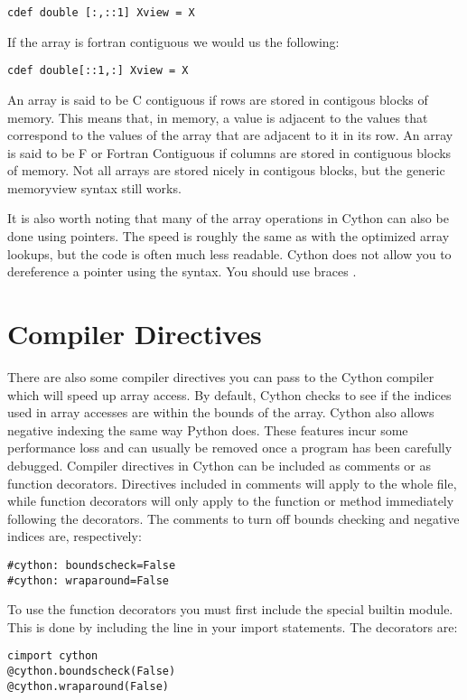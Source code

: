 \begin{lstlisting}
cdef double [:,::1] Xview = X
\end{lstlisting}

If the array is fortran contiguous we would us the following:

\begin{lstlisting}
cdef double[::1,:] Xview = X
\end{lstlisting}

An array is said to be C contiguous if rows are stored in contigous blocks of memory.
This means that, in memory, a value is adjacent to the values that correspond to the values of the array that are adjacent to it in its row.
An array is said to be F or Fortran Contiguous if columns are stored in contiguous blocks of memory.
Not all arrays are stored nicely in contigous blocks, but the generic memoryview syntax still works.

It is also worth noting that many of the array operations in Cython can also be done using pointers.
The speed is roughly the same as with the optimized array lookups, but the code is often much less readable.
Cython does not allow you to dereference a pointer using the \li{*} syntax.
You should use braces \li{[ ]}.

\section*{Compiler Directives}

There are also some compiler directives you can pass to the Cython compiler which will speed up array access.
By default, Cython checks to see if the indices used in array accesses are within the bounds of the array.
Cython also allows negative indexing the same way Python does.
These features incur some performance loss and can usually be removed once a program has been carefully debugged.
Compiler directives in Cython can be included as comments or as function decorators.
Directives included in comments will apply to the whole file, while function decorators will only apply to the function or method immediately following the decorators.
The comments to turn off bounds checking and negative indices are, respectively:
\begin{lstlisting}
#cython: boundscheck=False
#cython: wraparound=False
\end{lstlisting}

To use the function decorators you must first include the special builtin  module.
This is done by including the line  in your import statements.
The decorators are:
\begin{lstlisting}
cimport cython
@cython.boundscheck(False)
@cython.wraparound(False)
\end{lstlisting}

